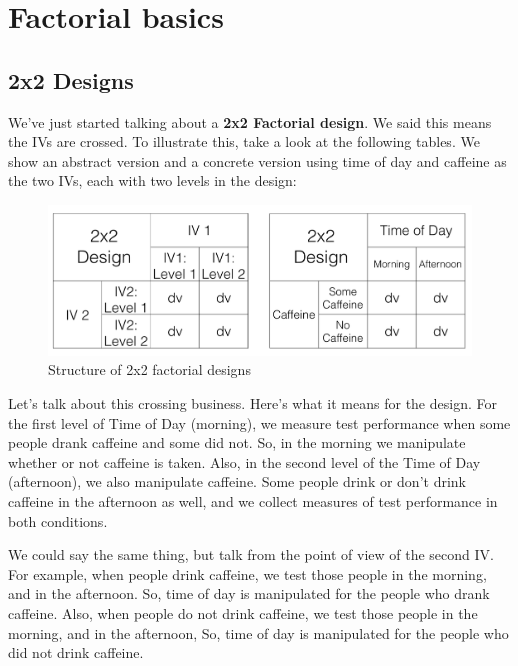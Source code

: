 \documentclass[]{book}
\begin{document}
\hypertarget{factorial-basics}{%
\section{Factorial basics}\label{factorial-basics}}

\hypertarget{x2-designs}{%
\subsection{2x2 Designs}\label{x2-designs}}

We've just started talking about a \textbf{2x2 Factorial design}. We said this means the IVs are crossed. To illustrate this, take a look at the following tables. We show an abstract version and a concrete version using time of day and caffeine as the two IVs, each with two levels in the design:

\begin{figure}
\centering
\includegraphics{figures/2x2Design.png}
\caption{\label{fig:9designs}Structure of 2x2 factorial designs}
\end{figure}

Let's talk about this crossing business. Here's what it means for the design. For the first level of Time of Day (morning), we measure test performance when some people drank caffeine and some did not. So, in the morning we manipulate whether or not caffeine is taken. Also, in the second level of the Time of Day (afternoon), we also manipulate caffeine. Some people drink or don't drink caffeine in the afternoon as well, and we collect measures of test performance in both conditions.

We could say the same thing, but talk from the point of view of the second IV. For example, when people drink caffeine, we test those people in the morning, and in the afternoon. So, time of day is manipulated for the people who drank caffeine. Also, when people do not drink caffeine, we test those people in the morning, and in the afternoon, So, time of day is manipulated for the people who did not drink caffeine.
\end{document}
